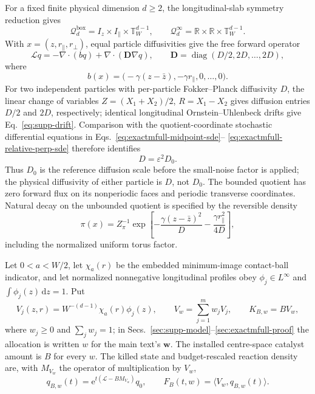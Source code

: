 \documentclass[aps,physrev,onecolumn,amsmath,amssymb,longbibliography]{revtex4-2}
\newcommand{\dd}{\mathrm d}
\newcommand{\e}{\mathrm e}
\newcommand{\Lfree}{\mathcal L}
\newcommand{\Qbox}{\mathcal Q_d^{\mathrm{box}}}
\newcommand{\Qinf}{\mathcal Q_d^{\infty}}
\begin{document}
For a fixed finite physical dimension \(d\ge2\), the longitudinal-slab
symmetry reduction gives
\begin{equation}
 \Qbox=I_z\times I_\parallel\times\mathbb T_W^{d-1},
 \qquad
 \Qinf=\mathbb R\times\mathbb R\times\mathbb T_W^{d-1}.
 \label{eq:supp-domains}
\end{equation}
With \(x=(z,r_\parallel,r_\perp)\), equal particle diffusivities give the free
forward operator
\begin{equation}
 \Lfree q=-\nabla\!\cdot(bq)+\nabla\!\cdot(\bm D\nabla q),
 \qquad
 \bm D=\operatorname{diag}(D/2,2D,\ldots,2D),
 \label{eq:supp-free-generator}
\end{equation}
where
\begin{equation}
 b(x)=\bigl(-\gamma(z-\bar z),-\gamma r_\parallel,0,\ldots,0\bigr).
 \label{eq:supp-drift}
\end{equation}
For two independent particles with per-particle Fokker--Planck diffusivity
\(D\), the linear change of variables
\(Z=(X_1+X_2)/2\), \(R=X_1-X_2\) gives diffusion entries \(D/2\) and
\(2D\), respectively; identical longitudinal Ornstein--Uhlenbeck drifts give
Eq.~\eqref{eq:supp-drift}.  Comparison with the quotient-coordinate
stochastic differential equations in
Eqs.~\eqref{eq:exactmfull-midpoint-sde}--%
\eqref{eq:exactmfull-relative-perp-sde} therefore identifies
\begin{equation}
 D=\varepsilon^2D_0.
 \label{eq:supp-D-identification}
\end{equation}
Thus \(D_0\) is the reference diffusion scale before the small-noise factor
is applied; the physical diffusivity of either particle is \(D\), not
\(D_0\).
The bounded quotient has zero forward flux on its nonperiodic faces and
periodic transverse coordinates.  Natural decay on the unbounded quotient is
specified by the reversible density
\begin{equation}
 \pi(x)=Z_\pi^{-1}
 \exp\!\left[-\frac{\gamma(z-\bar z)^2}{D}
              -\frac{\gamma r_\parallel^2}{4D}\right],
 \label{eq:supp-pi}
\end{equation}
including the normalized uniform torus factor.

Let \(0<a<W/2\), let \(\chi_a(r)\) be the embedded minimum-image contact-ball
indicator, and let normalized nonnegative longitudinal profiles obey
\(\phi_j\in L^\infty\) and \(\int\phi_j(z)\,\dd z=1\).  Put
\begin{equation}
 V_j(z,r)=W^{-(d-1)}\chi_a(r)\phi_j(z),\qquad
 V_w=\sum_{j=1}^m w_jV_j,\qquad K_{B,w}=BV_w,
 \label{eq:supp-profiles}
\end{equation}
where \(w_j\ge0\) and \(\sum_jw_j=1\); in
Secs.~\ref{sec:supp-model}--\ref{sec:exactmfull-proof} the allocation is
written \(w\) for the main text's \(\bm w\).  The installed centre-space
catalyst amount is \(B\) for every \(w\).  The killed state and budget-rescaled
reaction density are, with \(M_{V_w}\) the operator of multiplication by
\(V_w\),
\begin{equation}
 q_{B,w}(t)=\e^{t(\Lfree-BM_{V_w})}q_0,\qquad
 F_B(t,w)=\langle V_w,q_{B,w}(t)\rangle .
 \label{eq:supp-state}
\end{equation}
\end{document}
